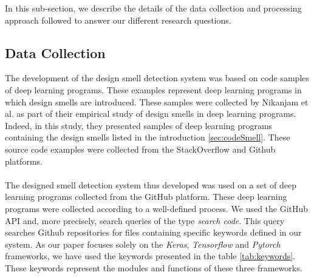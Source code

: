 \label{sec:studyDesign}
In this sub-section, we describe the details of the data collection and processing approach followed to answer our different research questions.





\subsection{Data Collection}
\label{sec:dataCollection}
The development of the design smell detection system was based on code samples of deep learning programs. These examples represent deep learning programs in which design smells are introduced. These samples were collected by Nikanjam et al. \cite{nikanjam2021design} as part of their empirical study of design smells in deep learning programs. Indeed, in this study, they presented samples of deep learning programs containing the design smells listed in the introduction \ref{sec:codeSmell}. These source code examples were collected from the StackOverflow and Github platforms.\\\\

The designed smell detection system thus developed was used on a set of deep learning programs collected from the GitHub platform. These deep learning programs were collected according to a well-defined process. We used the GitHub API and, more precisely, search queries of the type \emph{search code}. This query searches Github repositories for files containing specific keywords defined in our system. As our paper focuses solely on the \emph{Keras}, \emph{Tensorflow} and \emph{Pytorch} frameworks, we have used the keywords presented in the table \ref{tab:keywords}. These keywords represent the modules and functions of these three frameworks.\\


